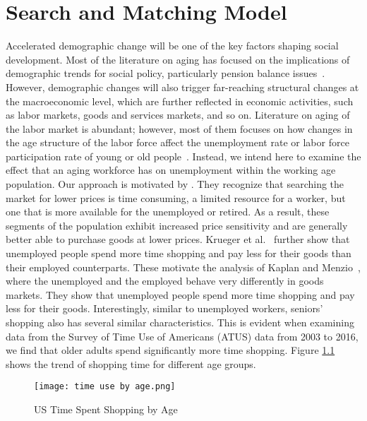 \documentclass[ %
    final,
    scrbook,
    listoffigures,
    listoftables, 
    glossary]{cu-thesis}
\begin{document}
\chapter{Search and Matching Model}
Accelerated demographic change will be one of the key factors shaping social development. Most of the literature on aging has focused on the implications of demographic trends for social policy, particularly pension balance issues~\cite{wacker2010aging,carta2021workforce,bongaarts2004population,vogel2017aging}. 
However, demographic changes will also trigger far-reaching structural changes at the macroeconomic level, which are further reflected in economic activities, such as labor markets, goods and services markets, and so on. 
Literature on aging of the labor market is abundant; however, most of them focuses on how changes in the age structure of the labor force affect the unemployment rate or labor force participation rate of young or old people~\cite{barnichon2018demographic,bell2011young,bhattacharya2001aging,johnson2012age}. Instead, we intend here to examine the effect that an aging workforce has on unemployment within the working age population.
Our approach is motivated by \cite{burdett1983equilibrium}. They recognize that searching the market for lower prices is time consuming, a limited resource for a worker, but one that is more available for the unemployed or retired.  As a result, these segments of the population exhibit increased price sensitivity and are generally better able to purchase goods at lower prices. Krueger et al.~\cite{krueger2010job} further show that unemployed people spend more time shopping and pay less for their goods than their employed counterparts. These motivate the analysis of Kaplan and Menzio~\cite{kaplan2016shopping}, where the unemployed and the employed behave very differently in goods markets. They show that unemployed people spend more time shopping and pay less for their goods. Interestingly, similar to unemployed workers, seniors’ shopping also has several similar characteristics. This is evident when examining data from the Survey
of Time Use of Americans (ATUS) data from 2003 to 2016, we find that older adults spend significantly more time shopping. Figure \ref{fig:ats} shows the trend of shopping time for different age groups. 
\begin{figure}[h]
\centering
\texttt{[image: time use by age.png]}
\caption{US Time Spent Shopping by Age}
\label{fig:ats}
\end{figure}
\end{document}
